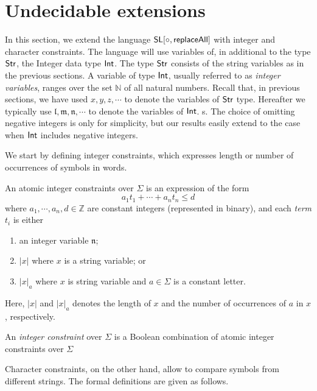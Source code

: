 
\section{Undecidable extensions}

In this section, we extend the language $\mathsf{SL}[\circ,\mathsf{replaceAll}]$ with integer and character constraints. The language will use variables of, in additional to the type ${\sf Str}$, the Integer data type ${\sf Int}$. The type ${\sf Str}$ consists of the string variables as in the previous sections. A variable of type ${\sf Int}$, usually referred to as \emph{integer variables}, ranges over the set $\mathbb{N}$ of all natural numbers. Recall that, in previous sections, we have used $x, y, z, \cdots$ to denote the variables of ${\sf Str}$ type.  Hereafter we typically use $\mathfrak{l}, \mathfrak{m}, \mathfrak{n}, \cdots$ to denote the variables of ${\sf Int}$. s. The
choice of omitting negative integers is only for simplicity, but our
results easily extend to the case when ${\sf Int}$ includes negative integers.

We start by defining integer constraints, which expresses length or number of occurrences of symbols in words. 


\begin{definition} \label{def:intconst} 
	An atomic integer constraints over $\Sigma$ is an expression of the form
	\[a_1t_1+\cdots+a_nt_n\leq d\]
where $a_1, \cdots, a_n,d\in \mathbb{Z}$ are constant integers (represented in binary), and each \emph{term} $t_i$ is either 
	\begin{enumerate}
		\item an integer variable $\mathfrak{n}$;
		\item $|x|$ where $x$ is a  string variable; or 
		\item $|x|_a$ where $x$ is string variable and $a\in \Sigma$ is a constant letter.
	\end{enumerate}
Here, $|x|$ and $|x|_a$ denotes the length of $x$ and the number of occurrences of $a$ in $x$, respectively. 

An \emph{integer constraint} over $\Sigma$ is a Boolean combination of atomic integer constraints over $\Sigma$
\end{definition}

Character constraints, on the other hand, allow to compare symbols from different strings. The formal definitions are given as follows. 

